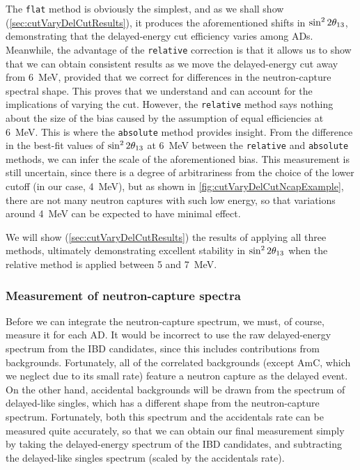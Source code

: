 \documentclass[../thesis.tex]{subfiles}
\begin{document}
The \texttt{flat} method is obviously the simplest, and as we shall show (\autoref{sec:cutVaryDelCutResults}), it produces the aforementioned shifts in $\sin^2 2\theta_{13}$, demonstrating that the delayed-energy cut efficiency varies among ADs. Meanwhile, the advantage of the \texttt{relative} correction is that it allows us to show that we can obtain consistent results as we move the delayed-energy cut away from 6~MeV, provided that we correct for differences in the neutron-capture spectral shape. This proves that we understand and can account for the implications of varying the cut. However, the \texttt{relative} method says nothing about the size of the bias caused by the assumption of equal efficiencies at 6~MeV. This is where the \texttt{absolute} method provides insight. From the difference in the best-fit values of $\sin^2 2\theta_{13}$ at 6~MeV between the \texttt{relative} and \texttt{absolute} methods, we can infer the scale of the aforementioned bias. This measurement is still uncertain, since there is a degree of arbitrariness from the choice of the lower cutoff (in our case, 4~MeV), but as shown in \autoref{fig:cutVaryDelCutNcapExample}, there are not many neutron captures with such low energy, so that variations around 4~MeV can be expected to have minimal effect.

We will show (\autoref{sec:cutVaryDelCutResults}) the results of applying all three methods, ultimately demonstrating excellent stability in $\sin^2 2\theta_{13}$ when the relative method is applied between 5 and 7~MeV.

\subsubsection{Measurement of neutron-capture spectra}
\label{sec:cutVaryDelCutSpecMeas}

Before we can integrate the neutron-capture spectrum, we must, of course, measure it for each AD. It would be incorrect to use the raw delayed-energy spectrum from the IBD candidates, since this includes contributions from backgrounds. Fortunately, all of the correlated backgrounds (except AmC, which we neglect due to its small rate) feature a neutron capture as the delayed event. On the other hand, accidental backgrounds will be drawn from the spectrum of delayed-like singles, which has a different shape from the neutron-capture spectrum. Fortunately, both this spectrum and the accidentals rate can be measured quite accurately, so that we can obtain our final measurement simply by taking the delayed-energy spectrum of the IBD candidates, and subtracting the delayed-like singles spectrum (scaled by the accidentals rate).
\end{document}
